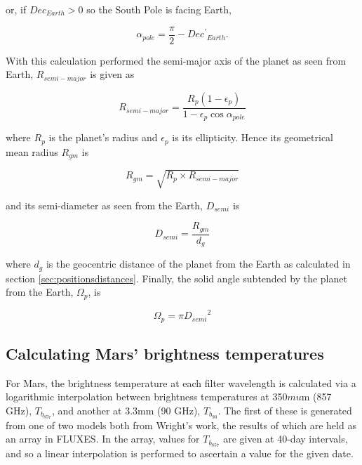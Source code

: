 \documentclass[11pt,twoside]{article}
\newcommand{\xlabel}[1]{}
\renewcommand{\_}{\texttt{\symbol{95}}}
\begin{document}
or, if $Dec_{Earth} > 0$ so the South Pole is facing Earth, 

\begin{displaymath}
\alpha_{pole} =  \frac{\pi}{2} - {Dec^\prime}_{Earth}. 
\end{displaymath}

With this calculation performed the semi-major axis of the planet as seen from Earth, $R_{semi-major}$ is given as 

\begin{displaymath}
R_{semi-major} = \frac{R_{p} (1 - \epsilon_p)}{1 - \epsilon_p \cos \alpha_{pole}}
\end {displaymath}

where $R_p$ is the planet's radius and $\epsilon_p$ is its ellipticity.  Hence its geometrical mean radius $R_{gm}$ is

\begin{displaymath}
R_{gm} = \sqrt{R_p \times R_{semi-major}}
\end{displaymath}

and its semi-diameter as seen from the Earth, $D_{semi}$ is

\begin{displaymath}
D_{semi} = \frac{R_{gm}}{d_g}
\end{displaymath}

where $d_g$ is the geocentric distance of the planet from the Earth as calculated in section \ref{sec:positionsdistances}.  Finally, the solid angle subtended by the planet from the Earth, $\Omega_p$, is

\begin{displaymath}
\Omega_p = \pi {D_{semi}}^2
\end{displaymath}

\subsection{Calculating Mars' brightness temperatures}
\xlabel{marsbright}
\label{sec:marsbright}

For Mars, the brightness temperature at each filter wavelength is calculated via a logarithmic interpolation between brightness temperatures at 350$mu$m (857 GHz), $T_{b_{857}}$, and another at 3.3mm (90 GHz), $T_{b_{90}}$.  The first of these is generated from one of two models both from Wright's work, the results of which are held as an array in FLUXES.  In the array, values for $T_{b_{857}}$ are given at 40-day intervals, and so a linear interpolation is performed to ascertain a value for the given date.
\end{document}
